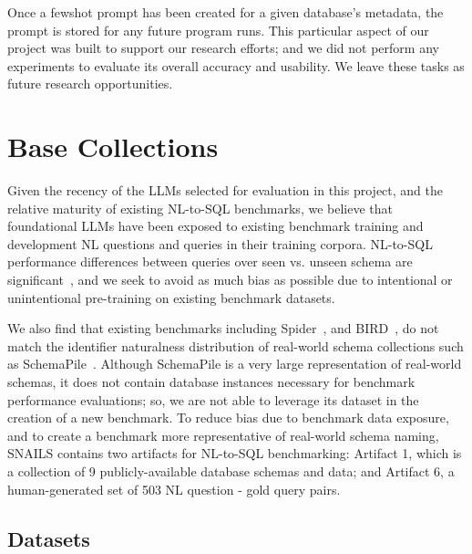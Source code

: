 Once a fewshot prompt has been created for a given database's metadata, the prompt is stored for any future program runs.
This particular aspect of our project was built to support our research efforts; and we did not perform any experiments to evaluate its overall accuracy and usability.
We leave these tasks as future research opportunities.



\section{Base Collections}


Given the recency of the LLMs selected for evaluation in this project, and the relative maturity of existing NL-to-SQL benchmarks, we believe that foundational LLMs have been exposed to existing benchmark training and development NL questions and queries in their training corpora.
NL-to-SQL performance differences between queries over seen vs. unseen schema are significant~\cite{49288}, and we seek to avoid as much bias as possible due to intentional or unintentional pre-training on existing benchmark datasets.

We also find that existing benchmarks including Spider~\cite{Yu&al.18c}, and BIRD~\cite{li2023llm}, do not match the identifier naturalness distribution of real-world schema collections such as SchemaPile~\cite{doehmen2024schemapile}.
Although SchemaPile is a very large representation of real-world schemas, it does not contain database instances necessary for benchmark performance evaluations; so, we are not able to leverage its dataset in the creation of a new benchmark.
To reduce bias due to benchmark data exposure, and to create a benchmark more representative of real-world schema naming, SNAILS contains two artifacts for NL-to-SQL benchmarking: Artifact 1, which is a collection of 9 publicly-available database schemas and data; and Artifact 6, a human-generated set of 503 NL question - gold query pairs.

\subsection{Datasets}
\label{subsection:benchmark-datasets}

